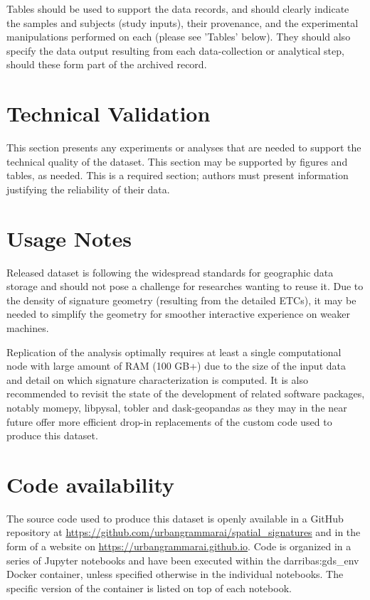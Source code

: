 \documentclass[fleqn,10pt]{wlscirep}
\begin{document}
Tables should be used to support the data records, and should clearly indicate the
samples and subjects (study inputs), their provenance, and the experimental
manipulations performed on each (please see 'Tables' below). They should also specify
the data output resulting from each data-collection or analytical step, should these
form part of the archived record.



\section*{Technical Validation}

This section presents any experiments or analyses that are needed to support the
technical quality of the dataset. This section may be supported by figures and tables,
as needed. This is a required section; authors must present information justifying the
reliability of their data.




\section*{Usage Notes}

Released dataset is following the widespread standards for geographic data storage and
should not pose a challenge for researches wanting to reuse it. Due to the density of
signature geometry (resulting from the detailed ETCs), it may be needed to simplify the
geometry for smoother interactive experience on weaker machines.

Replication of the analysis optimally requires at least a single computational node with
large amount of RAM (100 GB+) due to the size of the input data and detail on which
signature characterization is computed. It is also recommended to revisit the state of
the development of related software packages, notably momepy, libpysal, tobler and
dask-geopandas as they may in the near future offer more efficient drop-in replacements
of the custom code used to produce this dataset.

\section*{Code availability}

The source code used to produce this dataset is openly available in a GitHub repository
at
\hyperlink{https://github.com/urbangrammarai/spatial\_signatures}{https://github.com/urbangrammarai/spatial\_signatures}
and in the form of a website on
\hyperlink{https://urbangrammarai.github.io}{https://urbangrammarai.github.io}.
Code is
organized in a series of Jupyter notebooks and have been executed within the darribas:gds\_env
Docker container, unless specified otherwise in the individual notebooks. The specific version
of the container is listed on top of each notebook.
\end{document}
